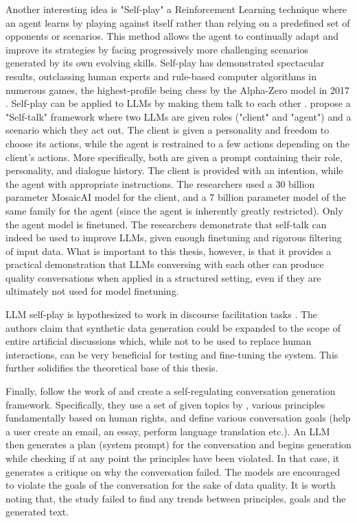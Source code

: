 Another interesting idea is "Self-play" a Reinforcement Learning technique where an agent learns by playing against itself rather than relying on a predefined set of opponents or scenarios. This method allows the agent to continually adapt and improve its strategies by facing progressively more challenging scenarios generated by its own evolving skills. Self-play has demonstrated spectacular results, outclassing human experts and rule-based computer algorithms in numerous games, the highest-profile being chess by the Alpha-Zero model in 2017 \cite{silver2017masteringchessshogiselfplay}. Self-play can be applied to LLMs by making them talk to each other \cite{cheng2024selfplayingadversariallanguagegame}.  \citet{ulmer2024bootstrappingllmbasedtaskorienteddialogue} propose a "Self-talk" framework where two LLMs are given roles ("client" and "agent") and a scenario which they act out. The client is given a personality and freedom to choose its actions, while the agent is restrained to a few actions depending on the client's actions. More specifically, both are given a prompt containing their role, personality, and dialogue history. The client is provided with an intention, while the agent with appropriate instructions. The researchers used a 30 billion parameter MosaicAI \cite{MosaicML2023} model for the client, and a 7 billion parameter model of the same family for the agent (since the agent is inherently greatly restricted). Only the agent model is finetuned. The researchers demonstrate that self-talk can indeed be used to improve LLMs, given enough finetuning and rigorous filtering of input data. What is important to this thesis, however, is that it provides a practical demonstration that LLMs conversing with each other can produce quality conversations when applied in a structured setting, even if they are ultimately not used for model finetuning.

LLM self-play is hypothesized to work in discourse facilitation tasks \cite{small-polis-llm}. The authors claim that synthetic data generation could be expanded to the scope of entire artificial discussions which, while not to be used to replace human interactions, can be very beneficial for testing and fine-tuning the system. This further solidifies the theoretical base of this thesis. 


Finally, \citet{lambert2024selfdirectedsyntheticdialoguesrevisions} follow the work of \citet{Bai2022ConstitutionalAH} and create a self-regulating conversation generation framework. Specifically, they use a set of given topics by \citet{Castricato2024SuppressingPE}, various principles fundamentally based on human rights, and define various conversation goals (help a user create an email, an essay, perform language translation etc.). An LLM then generates a plan (system prompt) for the conversation and begins generation while checking if at any point the principles have been violated. In that case, it generates a critique on why the conversation failed. The models are encouraged to violate the goals of the conversation for the sake of data quality. It is worth noting that, the study failed to find any trends between principles, goals and the generated text.

